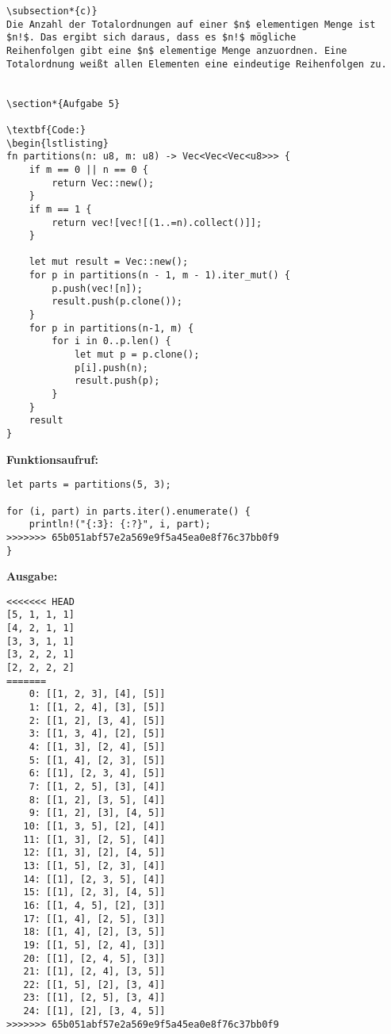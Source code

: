 \documentclass[a4paper]{scrartcl}
\begin{document}
\begin{lstlisting}
\subsection*{c)}
Die Anzahl der Totalordnungen auf einer $n$ elementigen Menge ist $n!$. Das ergibt sich daraus, dass es $n!$ mögliche 
Reihenfolgen gibt eine $n$ elementige Menge anzuordnen. Eine Totalordnung weißt allen Elementen eine eindeutige Reihenfolgen zu.


\section*{Aufgabe 5}

\textbf{Code:}
\begin{lstlisting}
fn partitions(n: u8, m: u8) -> Vec<Vec<Vec<u8>>> {
    if m == 0 || n == 0 {
        return Vec::new();
    }
    if m == 1 {
        return vec![vec![(1..=n).collect()]];
    }

    let mut result = Vec::new();
    for p in partitions(n - 1, m - 1).iter_mut() {
        p.push(vec![n]);
        result.push(p.clone());
    }
    for p in partitions(n-1, m) {
        for i in 0..p.len() {
            let mut p = p.clone();
            p[i].push(n);
            result.push(p);
        }
    }
    result
}
\end{lstlisting}

\textbf{Funktionsaufruf:}
\begin{lstlisting}
let parts = partitions(5, 3);

for (i, part) in parts.iter().enumerate() {
    println!("{:3}: {:?}", i, part);    
>>>>>>> 65b051abf57e2a569e9f5a45ea0e8f76c37bb0f9
}
\end{lstlisting}

\textbf{Ausgabe:}
\begin{lstlisting}
<<<<<<< HEAD
[5, 1, 1, 1]
[4, 2, 1, 1]
[3, 3, 1, 1]
[3, 2, 2, 1]
[2, 2, 2, 2]
=======
    0: [[1, 2, 3], [4], [5]]
    1: [[1, 2, 4], [3], [5]]
    2: [[1, 2], [3, 4], [5]]
    3: [[1, 3, 4], [2], [5]]
    4: [[1, 3], [2, 4], [5]]
    5: [[1, 4], [2, 3], [5]]
    6: [[1], [2, 3, 4], [5]]
    7: [[1, 2, 5], [3], [4]]
    8: [[1, 2], [3, 5], [4]]
    9: [[1, 2], [3], [4, 5]]
   10: [[1, 3, 5], [2], [4]]
   11: [[1, 3], [2, 5], [4]]
   12: [[1, 3], [2], [4, 5]]
   13: [[1, 5], [2, 3], [4]]
   14: [[1], [2, 3, 5], [4]]
   15: [[1], [2, 3], [4, 5]]
   16: [[1, 4, 5], [2], [3]]
   17: [[1, 4], [2, 5], [3]]
   18: [[1, 4], [2], [3, 5]]
   19: [[1, 5], [2, 4], [3]]
   20: [[1], [2, 4, 5], [3]]
   21: [[1], [2, 4], [3, 5]]
   22: [[1, 5], [2], [3, 4]]
   23: [[1], [2, 5], [3, 4]]
   24: [[1], [2], [3, 4, 5]]
>>>>>>> 65b051abf57e2a569e9f5a45ea0e8f76c37bb0f9
\end{lstlisting}
\end{document}
